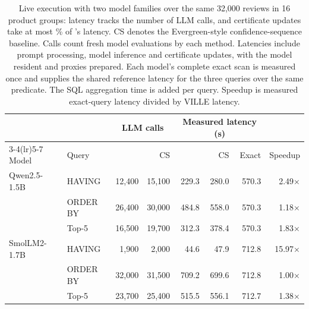 \begin{table}[t]
\centering
\caption{Live execution with two model families over the same 32,000 reviews in 16 product groups: latency tracks the number of LLM calls, and certificate updates take at most \numLiveMaxOverhead\% of \sys{}'s latency.
CS denotes the Evergreen-style confidence-sequence baseline. Calls count fresh model evaluations by each method.
Latencies include prompt processing, model inference and certificate updates, with the model
resident and proxies prepared. Each model's complete exact scan is measured once and supplies the shared reference
latency for the three queries over the same predicate. The SQL aggregation time is added per query.
Speedup is measured exact-query latency divided by VILLE latency.}
\label{tab:online}
\footnotesize
\setlength{\tabcolsep}{5pt}
\renewcommand{\arraystretch}{1.12}
\begin{tabular}{llrrrrrr}
\toprule
& & \multicolumn{2}{c}{LLM calls} & \multicolumn{3}{c}{Measured latency (s)} & \\
\cmidrule(lr){3-4}\cmidrule(lr){5-7}
Model & Query & \sys{} & CS & \sys{} & CS & Exact & Speedup \\
\midrule
Qwen2.5-1.5B & HAVING & 12,400 & 15,100 & 229.3 & 280.0 & 570.3 & 2.49$\times$ \\
 & ORDER BY & 26,400 & 30,000 & 484.8 & 558.0 & 570.3 & 1.18$\times$ \\
 & Top-5 & 16,500 & 19,700 & 312.3 & 378.4 & 570.3 & 1.83$\times$ \\
\midrule
SmolLM2-1.7B & HAVING & 1,900 & 2,000 & 44.6 & 47.9 & 712.8 & 15.97$\times$ \\
 & ORDER BY & 32,000 & 31,500 & 709.2 & 699.6 & 712.8 & 1.00$\times$ \\
 & Top-5 & 23,700 & 25,400 & 515.5 & 556.1 & 712.7 & 1.38$\times$ \\
\bottomrule
\end{tabular}
\end{table}
